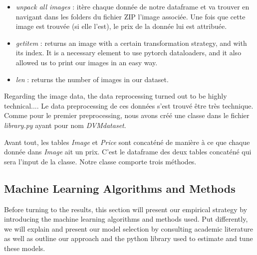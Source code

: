 \documentclass[12pt]{article}
\begin{document}
\begin{itemize}
    \item \textit{unpack all images} : itère chaque donnée de notre dataframe et va trouver en navigant dans les folders du fichier ZIP l'image associée. Une fois que cette image est trouvée (si elle l'est), le prix de la donnée lui est attribuée. 

    \item \textit{getitem} : returns an image with a certain transformation strategy, and with its index. It is a necessary element to use pytorch dataloaders, and it also allowed us to print our images in an easy way.
    
    \item \textit{len} : returns the number of images in our dataset.
\end{itemize}

\noindent Regarding the image data, the data reprocessing turned out to be highly technical....
\noindent Le data preprocessing de ces données s'est trouvé être très technique. Comme pour le premier preprocessing, nous avons créé une classe dans le fichier \textit{library.py} ayant pour nom \textit{DVMdataset}. 

\noindent Avant tout, les tables \textit{Image} et \textit{Price} sont concaténé de manière à ce que chaque donnée dans \textit{Image} ait un prix. C'est le dataframe des deux tables concaténé qui sera l'input de la classe. \noindent Notre classe comporte trois méthodes. 


\subsection{Machine Learning Algorithms and Methods}
Before turning to the results, this section will present our empirical strategy by introducing the machine learning algorithms and methods used. Put differently, we will explain and present our model selection by consulting academic literature as well as outline our approach and the python library used to estimate and tune these models.
\end{document}
